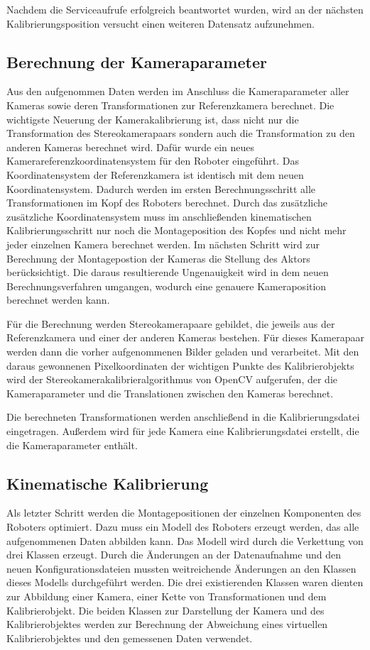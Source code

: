 Nachdem die Serviceaufrufe erfolgreich beantwortet wurden, wird an der nächsten
Kalibrierungsposition versucht einen weiteren Datensatz aufzunehmen.

\subsection{Berechnung der Kameraparameter}
\label{sub:Berechnung der Kameraparameter}

Aus den aufgenommen Daten werden im Anschluss die Kameraparameter aller Kameras sowie
deren Transformationen zur Referenzkamera berechnet. Die wichtigste Neuerung der 
Kamerakalibrierung ist, dass nicht nur die Transformation des Stereokamerapaars
sondern auch die Transformation zu den anderen Kameras berechnet wird. Dafür 
wurde ein neues Kamerareferenzkoordinatensystem für den Roboter eingeführt. Das
Koordinatensystem der Referenzkamera ist identisch mit dem neuen Koordinatensystem.
Dadurch werden im ersten Berechnungsschritt alle Transformationen im Kopf des 
Roboters berechnet. Durch das zusätzliche zusätzliche Koordinatensystem muss 
im anschließenden kinematischen Kalibrierungsschritt nur noch die Montageposition
des Kopfes und nicht mehr jeder einzelnen Kamera berechnet werden. Im nächsten
Schritt wird zur Berechnung der Montagepostion der Kameras die Stellung des 
Aktors berücksichtigt. Die daraus resultierende Ungenauigkeit wird in dem neuen
Berechnungsverfahren umgangen, wodurch eine genauere Kameraposition berechnet
werden kann. 

Für die Berechnung werden Stereokamerapaare gebildet, die jeweils aus der
Referenzkamera und einer der anderen Kameras bestehen. Für dieses 
Kamerapaar werden dann die vorher aufgenommenen Bilder geladen und 
verarbeitet. Mit den daraus gewonnenen Pixelkoordinaten der wichtigen Punkte 
des Kalibrierobjekts wird der Stereokamerakalibrieralgorithmus von OpenCV 
aufgerufen, der die Kameraparameter und die Translationen zwischen den Kameras 
berechnet. 

Die berechneten Transformationen werden anschließend in die Kalibrierungsdatei
eingetragen. Außerdem wird für jede Kamera eine Kalibrierungsdatei erstellt,
die die Kameraparameter enthält.


\subsection{Kinematische Kalibrierung}
\label{sub:Kinematische Kalibrierung_umsetzung}

Als letzter Schritt werden die Montagepositionen der einzelnen Komponenten des 
Roboters optimiert. Dazu muss ein Modell des Roboters erzeugt werden, das 
alle aufgenommenen Daten abbilden kann. Das Modell wird durch die Verkettung
von drei Klassen erzeugt. Durch die Änderungen an der Datenaufnahme
und den neuen Konfigurationsdateien mussten weitreichende Änderungen an den 
Klassen dieses Modells durchgeführt werden. Die drei existierenden Klassen 
waren dienten zur Abbildung einer Kamera, einer Kette von Transformationen und
dem Kalibrierobjekt. Die beiden Klassen zur Darstellung der Kamera und des 
Kalibrierobjektes werden zur Berechnung der Abweichung eines virtuellen
Kalibrierobjektes und den gemessenen Daten verwendet.

